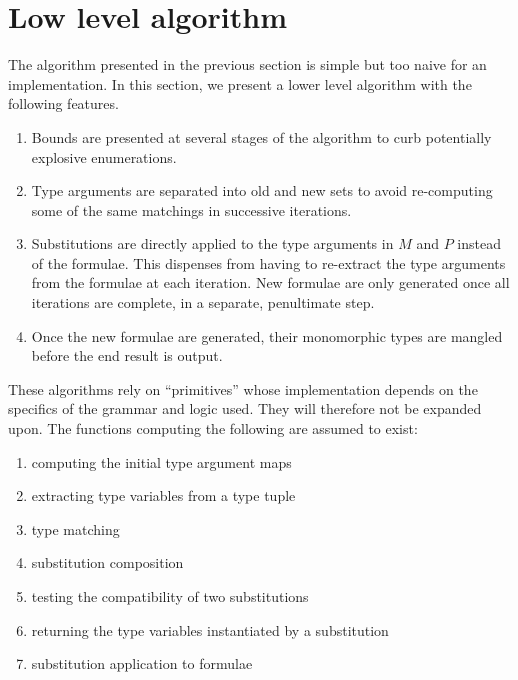 \documentclass[]{ceurart}
\begin{document}
\section{Low level algorithm}
\label{sec:low-level-algorithm}

The algorithm presented in the previous section is simple but too naive for an implementation. In this section, we present a lower level algorithm with the following features.
\begin{enumerate}
    \item[\labelitemi] Bounds are presented at several stages of the algorithm to curb potentially explosive enumerations.

    \item[\labelitemi] Type arguments are separated into old and new sets to avoid re-computing some of the same matchings in successive iterations.

    \item[\labelitemi] Substitutions are directly applied to the type arguments in $M$ and $P$ instead of the formulae. This dispenses from having to re-extract the type arguments from the formulae at each iteration. New formulae are only generated once all iterations are complete, in a separate, penultimate step.

    \item[\labelitemi] Once the new formulae are generated, their monomorphic types are mangled before the end result is output.
\end{enumerate}


These algorithms rely on ``primitives'' whose implementation depends on the specifics of the grammar and logic used. They will therefore not be expanded upon. The functions computing the following are assumed to exist:
\begin{enumerate}
   \item[\labelitemi] computing the initial type argument maps
   \item[\labelitemi] extracting type variables from a type tuple
   \item[\labelitemi] type matching
   \item[\labelitemi] substitution composition
   \item[\labelitemi] testing the compatibility of two substitutions
   \item[\labelitemi] returning the type variables instantiated by a substitution
   \item[\labelitemi] substitution application to formulae
\end{enumerate}
\end{document}

